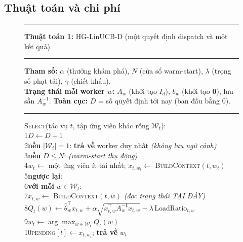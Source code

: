\documentclass[final,5p,times,twocolumn]{elsarticle}
\begin{document}
\subsection{Thuật toán và chi phí}
\label{sec:algo}

\begin{figure}[t]
\centering
\begin{minipage}{\columnwidth}
\footnotesize
\hrule\vspace{3pt}
\textbf{Thuật toán 1:} HG-LinUCB-D (một quyết định dispatch và một kết quả)
\vspace{3pt}\hrule\vspace{4pt}
\noindent\textbf{Tham số:} $\alpha$ (thưởng khám phá), $N$ (cửa sổ warm-start), $\lambda$ (trọng số phạt tải), $\gamma$ (chiết khấu).\\
\noindent\textbf{Trạng thái mỗi worker $w$:} $A_w$ (khởi tạo $I_d$), $b_w$ (khởi tạo $\mathbf{0}$), lưu sẵn $A_w^{-1}$. \textbf{Toàn cục:} $D$ = số quyết định tới nay (ban đầu bằng 0).
\vspace{4pt}\hrule\vspace{4pt}
\noindent\textsc{Select}(tác vụ $t$, tập ứng viên khác rỗng $\mathcal{W}_t$):\\
\hspace*{0.6em}1\quad $D\leftarrow D+1$\\
\hspace*{0.6em}2\quad \textbf{nếu} $|\mathcal{W}_t|=1$: \textbf{trả về} worker duy nhất \textit{(không lưu ngữ cảnh)}\\
\hspace*{0.6em}3\quad \textbf{nếu} $D\le N$: \textit{(warm-start thụ động)}\\
\hspace*{0.6em}4\quad\quad $w_t\leftarrow$ một ứng viên ít tải nhất; $x_{t,w_t}\leftarrow$ \textsc{BuildContext}$(t,w_t)$\\
\hspace*{0.6em}5\quad \textbf{ngược lại}:\\
\hspace*{0.6em}6\quad\quad \textbf{với mỗi} $w\in\mathcal{W}_t$:\\
\hspace*{0.6em}7\quad\quad\quad $x_{t,w}\leftarrow$ \textsc{BuildContext}$(t,w)$ \textit{(đọc trạng thái TẠI ĐÂY)}\\
\hspace*{0.6em}8\quad\quad\quad $Q_t(w)\leftarrow\hat\theta_w^\top x_{t,w}+\alpha\sqrt{x_{t,w}^\top A_w^{-1}x_{t,w}}-\lambda\,\text{LoadRatio}_{t,w}$\\
\hspace*{0.6em}9\quad\quad $w_t\leftarrow\arg\max_{w\in\mathcal{W}_t}Q_t(w)$\\
\hspace*{0.3em}10\quad \textsc{pending}$[t]\leftarrow x_{t,w_t}$; \textbf{trả về} $w_t$
\vspace{4pt}


\end{minipage}
\end{figure}
\end{document}
